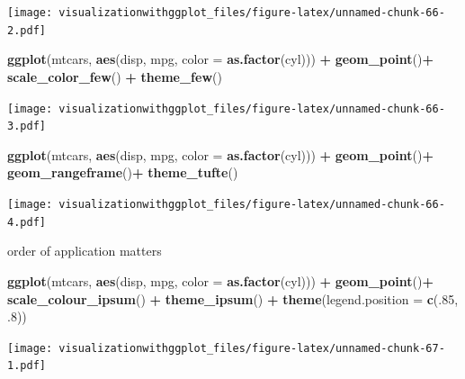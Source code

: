 \documentclass[]{krantz}
\makeatletter
\newenvironment{Shaded}{\begin{snugshade}}{\end{snugshade}}
\newcommand{\KeywordTok}[1]{\textcolor[rgb]{0.13,0.29,0.53}{\textbf{#1}}}
\newcommand{\DataTypeTok}[1]{\textcolor[rgb]{0.13,0.29,0.53}{#1}}
\newcommand{\DecValTok}[1]{\textcolor[rgb]{0.00,0.00,0.81}{#1}}
\newcommand{\StringTok}[1]{\textcolor[rgb]{0.31,0.60,0.02}{#1}}
\newcommand{\OperatorTok}[1]{\textcolor[rgb]{0.81,0.36,0.00}{\textbf{#1}}}
\newcommand{\NormalTok}[1]{#1}
\newenvironment{kframe}{%
\medskip{}
\setlength{\fboxsep}{.8em}
 \def\at@end@of@kframe{}%
 \ifinner\ifhmode%
  \def\at@end@of@kframe{\end{minipage}}%
  \begin{minipage}{\columnwidth}%
 \fi\fi%
 \def\FrameCommand##1{\hskip\@totalleftmargin \hskip-\fboxsep
 \colorbox{shadecolor}{##1}\hskip-\fboxsep
     \hskip-\linewidth \hskip-\@totalleftmargin \hskip\columnwidth}%
 \MakeFramed {\advance\hsize-\width
   \@totalleftmargin\z@ \linewidth\hsize
   \@setminipage}}%
 {\par\unskip\endMakeFramed%
 \at@end@of@kframe}
\renewenvironment{Shaded}{\begin{kframe}}{\end{kframe}}
\theoremstyle{definition}
\theoremstyle{definition}
\theoremstyle{definition}
\theoremstyle{remark}
\makeatother
\begin{document}
\texttt{[image: visualizationwithggplot\_files/figure-latex/unnamed-chunk-66-2.pdf]}

\begin{Shaded}
\begin{Highlighting}[]
\KeywordTok{ggplot}\NormalTok{(mtcars, }\KeywordTok{aes}\NormalTok{(disp, mpg, }\DataTypeTok{color =} \KeywordTok{as.factor}\NormalTok{(cyl))) }\OperatorTok{+}\StringTok{ }
\StringTok{  }\KeywordTok{geom_point}\NormalTok{()}\OperatorTok{+}\StringTok{     }
\StringTok{  }\KeywordTok{scale_color_few}\NormalTok{() }\OperatorTok{+}
\StringTok{    }\KeywordTok{theme_few}\NormalTok{()}
\end{Highlighting}
\end{Shaded}

\texttt{[image: visualizationwithggplot\_files/figure-latex/unnamed-chunk-66-3.pdf]}

\begin{Shaded}
\begin{Highlighting}[]
\KeywordTok{ggplot}\NormalTok{(mtcars, }\KeywordTok{aes}\NormalTok{(disp, mpg, }\DataTypeTok{color =} \KeywordTok{as.factor}\NormalTok{(cyl))) }\OperatorTok{+}\StringTok{    }
\StringTok{  }\KeywordTok{geom_point}\NormalTok{()}\OperatorTok{+}\StringTok{ }
\StringTok{    }\KeywordTok{geom_rangeframe}\NormalTok{()}\OperatorTok{+}\StringTok{ }
\StringTok{    }\KeywordTok{theme_tufte}\NormalTok{()}
\end{Highlighting}
\end{Shaded}

\texttt{[image: visualizationwithggplot\_files/figure-latex/unnamed-chunk-66-4.pdf]}

order of application matters

\begin{Shaded}
\begin{Highlighting}[]
\KeywordTok{ggplot}\NormalTok{(mtcars, }\KeywordTok{aes}\NormalTok{(disp, mpg, }\DataTypeTok{color =} \KeywordTok{as.factor}\NormalTok{(cyl))) }\OperatorTok{+}\StringTok{ }\KeywordTok{geom_point}\NormalTok{()}\OperatorTok{+}\StringTok{  }\KeywordTok{scale_colour_ipsum}\NormalTok{() }\OperatorTok{+}\StringTok{ }
\KeywordTok{theme_ipsum}\NormalTok{() }\OperatorTok{+}
\KeywordTok{theme}\NormalTok{(}\DataTypeTok{legend.position =} \KeywordTok{c}\NormalTok{(.}\DecValTok{85}\NormalTok{, .}\DecValTok{8}\NormalTok{))}
\end{Highlighting}
\end{Shaded}

\texttt{[image: visualizationwithggplot\_files/figure-latex/unnamed-chunk-67-1.pdf]}
\end{document}
